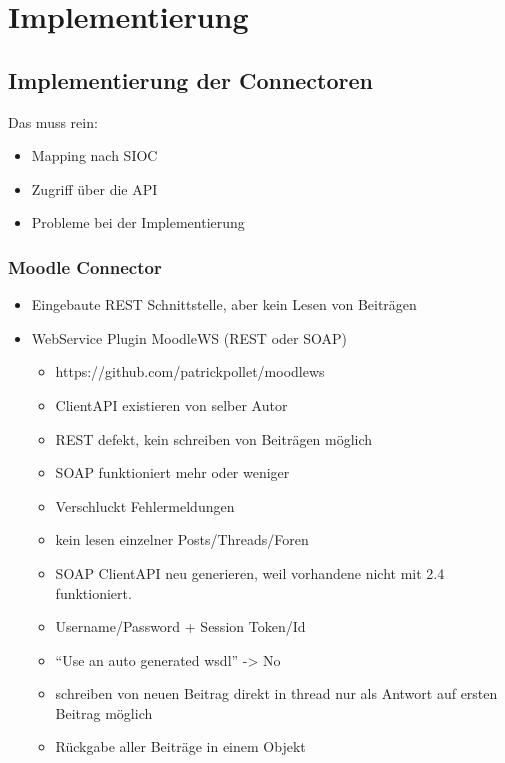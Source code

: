 
\chapter{Implementierung} %
\label{cha:implementierung}

\section{Implementierung der Connectoren} %
\label{sec:implementierung_der_connectoren}

Das muss rein:
\begin{itemize}
    \item Mapping nach SIOC
    \item Zugriff über die API
    \item Probleme bei der Implementierung
\end{itemize}

\subsection{Moodle Connector} %
\label{sub:moodle_connector}

\begin{itemize}
    \item Eingebaute REST Schnittstelle, aber kein Lesen von Beiträgen
    \item WebService Plugin MoodleWS (REST oder SOAP)
    \begin{itemize}
        \item https://github.com/patrickpollet/moodlews
        \item ClientAPI existieren von selber Autor
        \item REST defekt, kein schreiben von Beiträgen möglich
        \item SOAP funktioniert mehr oder weniger
        \item Verschluckt Fehlermeldungen
        \item kein lesen einzelner Posts/Threads/Foren
        \item SOAP ClientAPI neu generieren, weil vorhandene nicht mit 2.4 funktioniert.
        \item Username/Password + Session Token/Id
        \item “Use an auto generated wsdl” -> No
        \item schreiben von neuen Beitrag direkt in thread nur als Antwort auf ersten Beitrag möglich
        \item Rückgabe aller Beiträge in einem Objekt
    \end{itemize}
\end{itemize}

